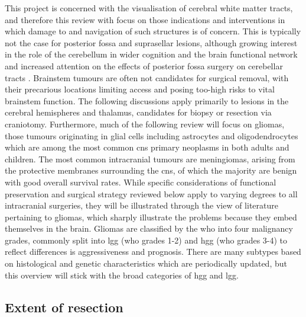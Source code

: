 This project is concerned with the visualisation of cerebral white matter tracts, and therefore this review with focus on those indications and interventions in which damage to and navigation of such structures is of concern.
This is typically not the case for posterior fossa and suprasellar lesions, although growing interest in the role of the cerebellum in wider cognition and the brain functional network and increased attention on the effects of posterior fossa surgery on cerebellar tracts \autocite{Toescu2021,Skye2023}.
Brainstem tumours are often not candidates for surgical removal, with their precarious locations limiting access and posing too-high risks to vital brainstem function.
The following discussions apply primarily to lesions in the cerebral hemispheres and thalamus, candidates for biopsy or resection via craniotomy.
Furthermore, much of the following review will focus on gliomas, those tumours originating in glial cells including astrocytes and oligodendrocytes which are among the most common \gls{cns} primary neoplasms in both adults\autocite{Ostrom2015,Wanis2021} and children\autocite{Ostrom2015}.
The most common intracranial tumours are meningiomas, arising from the protective membranes surrounding the \gls{cns}, of which the majority are benign with good overall survival rates\autocite{Rogers2015,Spena2022}.
While specific considerations of functional preservation and surgical strategy reviewed below apply to varying degrees to all intracranial surgeries, they will be illustrated through the view of literature pertaining to gliomas, which sharply illustrate the problems because they embed themselves in the brain.
Gliomas are classified by the \gls{who} into four malignancy grades, commonly split into \gls{lgg} (\gls{who} grades 1-2) and \gls{hgg} (\gls{who} grades 3-4) to reflect differences is aggressiveness and prognosis.
There are many subtypes based on histological and genetic characteristics which are periodically updated\autocite{Louis2021}, but this overview will stick with the broad categories of \gls{hgg} and \gls{lgg}.

\subsection{Extent of resection}


